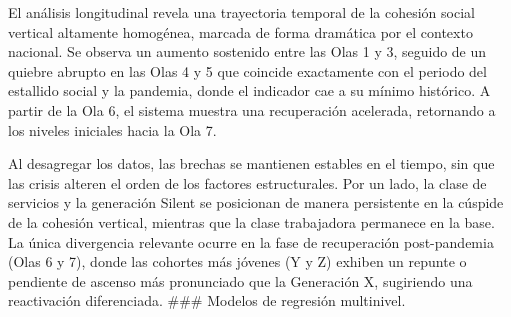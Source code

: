 \documentclass[
  spanish,
  a4paper,
  oneside]{scrbook}
\begin{document}
El análisis longitudinal revela una trayectoria temporal de la cohesión
social vertical altamente homogénea, marcada de forma dramática por el
contexto nacional. Se observa un aumento sostenido entre las Olas 1 y 3,
seguido de un quiebre abrupto en las Olas 4 y 5 que coincide exactamente
con el periodo del estallido social y la pandemia, donde el indicador
cae a su mínimo histórico. A partir de la Ola 6, el sistema muestra una
recuperación acelerada, retornando a los niveles iniciales hacia la Ola
7.

Al desagregar los datos, las brechas se mantienen estables en el tiempo,
sin que las crisis alteren el orden de los factores estructurales. Por
un lado, la clase de servicios y la generación Silent se posicionan de
manera persistente en la cúspide de la cohesión vertical, mientras que
la clase trabajadora permanece en la base. La única divergencia
relevante ocurre en la fase de recuperación post-pandemia (Olas 6 y 7),
donde las cohortes más jóvenes (Y y Z) exhiben un repunte o pendiente de
ascenso más pronunciado que la Generación X, sugiriendo una reactivación
diferenciada. \#\#\# Modelos de regresión multinivel.
\end{document}
